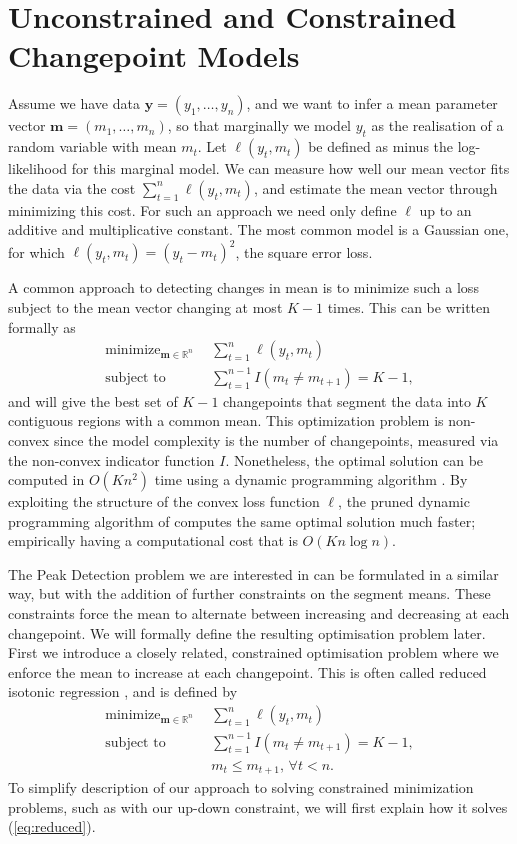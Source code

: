 \documentclass[aoas]{imsart}
\DeclareMathOperator*{\minimize}{minimize}
\newcommand{\RR}{\mathbb R}
\begin{document}
\section{Unconstrained and Constrained Changepoint Models}
\label{sec:models}

Assume we have data $\mathbf y=(y_1,\ldots,y_n)$, and we want to infer
a mean parameter vector $\mathbf m=(m_1,\ldots,m_n)$, so that marginally
we model $y_t$ as the realisation of a random variable with mean $m_t$. 
Let $\ell(y_t,m_t)$ be defined as minus the log-likelihood for this marginal model.
We can measure how well our mean vector fits the data via the cost
$\sum_{t=1}^n \ell(y_t,m_t)$, and estimate the mean vector through minimizing this cost.
For such an approach we need only define $\ell$ up to an additive and multiplicative constant. The
most common model is a Gaussian one, for which $\ell(y_t,m_t)=(y_t-m_t)^2$, the square error loss.

A common approach to detecting changes in mean is to minimize such a loss 
subject to the mean vector changing at most $K-1$ times. This can be written formally
as
\begin{align}
  \label{eq:optimal_segment_neighborhood}
  \minimize_{\mathbf m\in\RR^n} &\ \ 
  \sum_{t=1}^n \ell(y_t, m_t)\\
  \text{subject to} &\ \  \sum_{t=1}^{n-1} I(m_t \neq m_{t+1}) = K-1,
  \nonumber
\end{align}
and will give the best set of $K-1$ changepoints that segment the data into $K$
contiguous regions with a common mean.  This optimization problem is non-convex since the model complexity is
the number of changepoints, measured via the non-convex indicator
function $I$. Nonetheless, the optimal solution can be computed in
$O(K n^2)$ time using a dynamic programming algorithm
\citep{segment-neighborhood}. By exploiting the structure of the
convex loss function $\ell$, the pruned dynamic programming algorithm
of \citet{pruned-dp} computes the same optimal solution much faster; empirically
having a computational cost that is
$O(K n \log n)$.

The Peak Detection problem we are interested in can be formulated in a similar way, but with
the addition of further constraints on the segment means. These constraints force the mean
to alternate between increasing and decreasing at each changepoint. We will formally define the resulting
optimisation problem later. First we introduce a closely related, constrained optimisation
problem where we enforce the mean to increase at each changepoint. This is
often called reduced isotonic
regression \citep{reduced-monotonic-regression}, and is defined by
\begin{align}
  \label{eq:reduced}
  \minimize_{\mathbf m\in\RR^n} &\ \ 
  \sum_{t=1}^n \ell(y_t, m_t)\\
  \text{subject to} &\ \  \sum_{t=1}^{n-1} I(m_t \neq m_{t+1}) = K-1,
  \nonumber\\
  &\ \  m_t \leq m_{t+1},\, \forall t<n.
  \nonumber 
\end{align}
To simplify description of our approach to solving constrained minimization problems, such as with our
up-down constraint, we will first explain how it solves (\ref{eq:reduced}).
\end{document}
